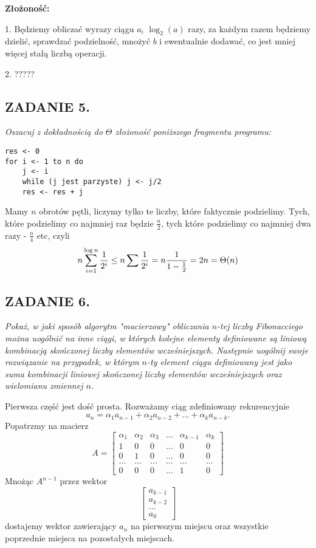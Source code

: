 \documentclass{article}
\begin{document}
\textbf{Złożoność:}

1. Będziemy obliczać wyrazy ciągu $a_i$ $\log_2(a)$ razy, za każdym razem będziemy dzielić, sprawdzać podzielność, mnożyć $b$ i ewentualnie dodawać, co jest mniej więcej stałą liczbą operacji.

2. {\color{orange}?????}

\subsection*{ZADANIE 5.}
\emph{Oszacuj z dokładnością do $\Theta$ złożoność poniższego fragmentu programu:}
\begin{lstlisting}
res <- 0
for i <- 1 to n do
    j <- i
    while (j jest parzyste) j <- j/2
    res <- res + j
\end{lstlisting}

Mamy $n$ obrotów pętli, liczymy tylko te liczby, które faktycznie podzielimy. Tych, które podzielimy co najmniej raz będzie $\frac n2$, tych które podzielimy co najmniej dwa razy - $\frac n4$ etc, czyli
$$n\sum\limits_{i=1}^{\log n}{1\over2^i}\leq n\sum{1\over 2^i}=n{1\over1-\frac12}=2n=\Theta(n)$$

\subsection*{ZADANIE 6.}
\emph{Pokaż, w jaki sposób algorytm "macierzowy" obliczania $n$-tej liczby Fibonacciego można uogólnić na inne ciągi, w których kolejne elementy definiowane są liniową kombinacją skończonej liczby elementów wcześniejszych. Następnie uogólnij swoje rozwiązanie na przypadek, w którym $n$-ty element ciągu definiowany jest jako suma kombinacji liniowej skończonej liczby elementów wcześniejszych oraz wielomianu zmiennej $n$.}
\medskip

Pierwsza część jest dość prosta. Rozważamy ciąg zdefiniowany rekurencyjnie
$$a_n=\alpha_1a_{n-1}+\alpha_2a_{n-2}+...+\alpha_ka_{n-k}.$$
Popatrzmy na macierz
$$A=\begin{bmatrix}
    \alpha_1 & \alpha_2 & \alpha_3 & ... &\alpha_{k-1} & \alpha_k\\
    1 & 0 & 0 & ... & 0 & 0\\
    0 & 1 & 0 & ... & 0 & 0\\
    ... & ... & ... & ... & ... & ...\\
    0 & 0 & 0 & ... & 1 & 0
\end{bmatrix}$$
Mnożąc $A^{n-1}$ przez wektor
$$\begin{bmatrix}
    a_{k-1}\\
    a_{k-2}\\
    ...\\
    a_0
\end{bmatrix}$$
dostajemy wektor zawierający $a_n$ na pierwszym miejscu oraz wszystkie poprzednie miejsca na pozostałych miejscach.
\smallskip
\end{document}
